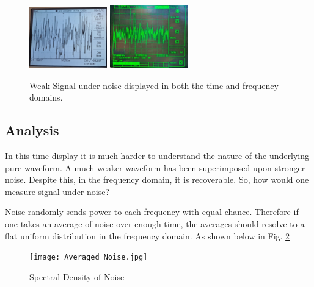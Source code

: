 \documentclass[prl,twocolumn,superscriptaddress,floatfix]{revtex4}
\begin{document}
\begin{figure}[H]
    \begin{center}
    \includegraphics[width = 0.3\textwidth]{Time Data C.jpg}
    \includegraphics[width = 0.3\textwidth]{Signal C under Noise.jpg}
    \caption{\label{fig:2}Weak Signal under noise displayed in both the time and frequency domains.}
    \end{center}
\end{figure}

\subsection{Analysis}
In this time display it is much harder to understand the nature of the underlying pure waveform.
A much weaker waveform has been superimposed upon stronger noise.
Despite this, in the frequency domain, it is recoverable. So, how would one measure signal under noise?

Noise randomly sends power to each frequency with equal chance.
Therefore if one takes an average of noise over enough time, the averages should resolve to a flat uniform distribution in the frequency domain. As shown below in Fig. \ref{fig:averaged noise}

 \begin{figure}[H]
    \centering
    \texttt{[image: Averaged Noise.jpg]}
    \caption{Spectral Density of Noise}
    \label{fig:averaged noise}
 \end{figure}
\end{document}
